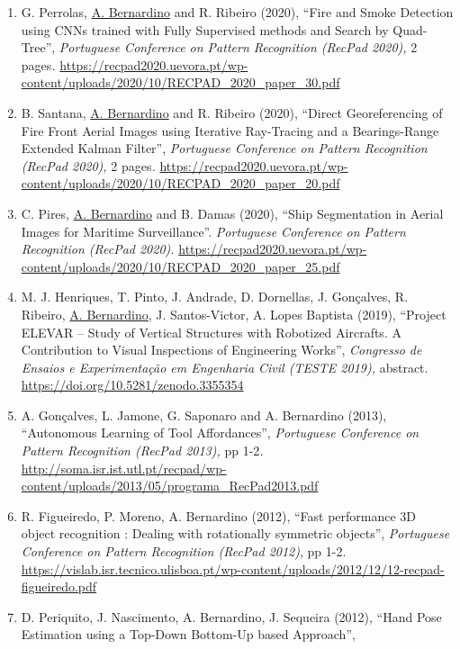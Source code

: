 \documentclass[
]{article}
\begin{document}
\begin{enumerate}
{  Recognition (RecPad 2020),} 2 pages\emph{.}
  \url{https://recpad2020.uevora.pt/wp-content/uploads/2020/10/RECPAD_2020_paper_34.pdf}~
\item
  G. Perrolas, \ul{A. Bernardino} and R. Ribeiro (2020), ``Fire and
  Smoke Detection using CNN\textquotesingle s trained with Fully
  Supervised methods and Search by Quad-Tree'', \emph{Portuguese
  Conference on Pattern Recognition (RecPad 2020),} 2 pages\emph{.}
  \url{https://recpad2020.uevora.pt/wp-content/uploads/2020/10/RECPAD_2020_paper_30.pdf}~
\item
  B. Santana, \ul{A. Bernardino} and R. Ribeiro (2020), ``Direct
  Georeferencing of Fire Front Aerial Images using Iterative Ray-Tracing
  and a Bearings-Range Extended Kalman Filter'', \emph{Portuguese
  Conference on Pattern Recognition (RecPad 2020),} 2 pages\emph{.}
  \url{https://recpad2020.uevora.pt/wp-content/uploads/2020/10/RECPAD_2020_paper_20.pdf}~
\item
  C. Pires, \ul{A. Bernardino} and B. Damas (2020), ``Ship Segmentation
  in Aerial Images for Maritime Surveillance''. \emph{Portuguese
  Conference on Pattern Recognition (RecPad 2020).}
  \url{https://recpad2020.uevora.pt/wp-content/uploads/2020/10/RECPAD_2020_paper_25.pdf}
\item
  M. J. Henriques, T. Pinto, J. Andrade, D. Dornellas, J. Gonçalves, R.
  Ribeiro, \ul{A. Bernardino}, J. Santos-Victor, A. Lopes Baptista
  (2019), ``Project ELEVAR -- Study of Vertical Structures with
  Robotized Aircrafts. A Contribution to Visual Inspections of
  Engineering Works'', \emph{Congresso de Ensaios e Experimentação em
  Engenharia Civil (TESTE 2019),} abstract.
  \url{https://doi.org/10.5281/zenodo.3355354}~
\item
  A. Gonçalves, L. Jamone, G. Saponaro and A. Bernardino (2013),
  ``Autonomous Learning of Tool Affordances'', \emph{Portuguese
  Conference on Pattern Recognition (RecPad 2013),} pp 1-2\emph{.}
  \url{http://soma.isr.ist.utl.pt/recpad/wp-content/uploads/2013/05/programa_RecPad2013.pdf}
\item
  R. Figueiredo, P. Moreno, A. Bernardino (2012), ``Fast performance 3D
  object recognition : Dealing with rotationally symmetric objects'',
  \emph{Portuguese Conference on Pattern Recognition (RecPad 2012)}, pp
  1-2.
  \url{https://vislab.isr.tecnico.ulisboa.pt/wp-content/uploads/2012/12/12-recpad-figueiredo.pdf}
\item
  D. Periquito, J. Nascimento, A. Bernardino, J. Sequeira (2012), ``Hand
  Pose Estimation using a Top-Down Bottom-Up based Approach'',

\end{enumerate}
\end{document}
